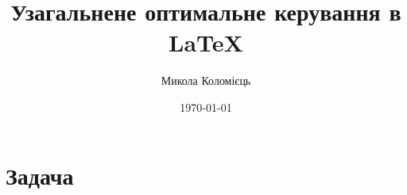 \documentclass[a4paper]{article}
\title{Узагальнене оптимальне керування в \LaTeX}
\author{Микола Коломієць}
\date{\today}
\begin{document}
    \maketitle

    \tableofcontents

    \section{Задача}


    
\end{document}
